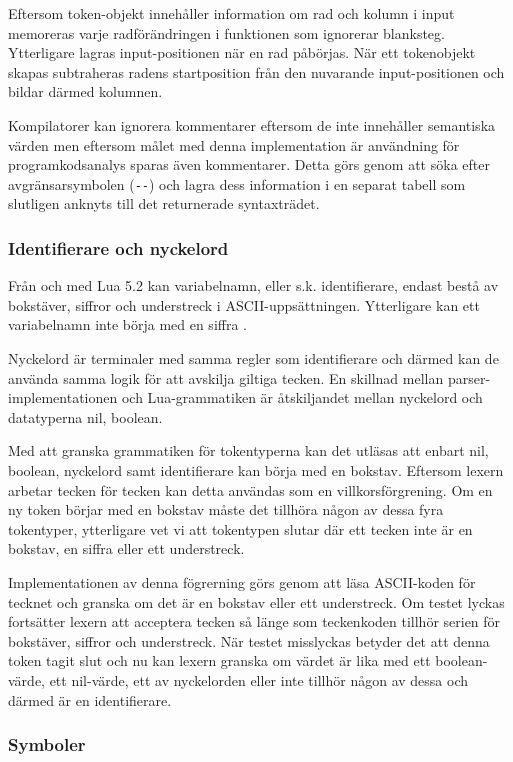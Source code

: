 Eftersom token-objekt innehåller information om rad och kolumn i input
memoreras varje radförändringen i funktionen som ignorerar blanksteg.
Ytterligare lagras input-positionen när en rad påbörjas. När ett tokenobjekt
skapas subtraheras radens startposition från den nuvarande input-positionen
och bildar därmed kolumnen.

Kompilatorer kan ignorera kommentarer eftersom de inte innehåller semantiska
värden men eftersom målet med denna implementation är användning för
programkodsanalys sparas även kommentarer. Detta görs genom att söka efter
avgränsarsymbolen (\verb+--+) och lagra dess information i en separat tabell
som slutligen anknyts till det returnerade syntaxträdet.

\subsubsection{Identifierare och nyckelord}

Från och med Lua 5.2 kan variabelnamn, eller s.k. identifierare, endast bestå av
bokstäver, siffror och understreck i ASCII-uppsättningen. Ytterligare kan ett
variabelnamn inte börja med en siffra \citep{luaref}.

Nyckelord är terminaler med samma regler som identifierare och därmed kan de
använda samma logik för att avskilja giltiga tecken. En skillnad mellan
parser-implementationen och Lua-grammatiken är åtskiljandet mellan nyckelord
och datatyperna nil, boolean.

Med att granska grammatiken för tokentyperna kan det utläsas att enbart nil,
boolean, nyckelord samt identifierare kan börja med en bokstav. Eftersom
lexern arbetar tecken för tecken kan detta användas som en villkorsförgrening.
Om en ny token börjar med en bokstav måste det tillhöra någon av dessa fyra
tokentyper, ytterligare vet vi att tokentypen slutar där ett tecken inte är en
bokstav, en siffra eller ett understreck.

Implementationen av denna fögrerning görs genom att läsa ASCII-koden för
tecknet och granska om det är en bokstav eller ett understreck. Om testet
lyckas fortsätter lexern att acceptera tecken så länge som teckenkoden tillhör
serien för bokstäver, siffror och understreck. När testet misslyckas betyder
det att denna token tagit slut och nu kan lexern granska om värdet är lika med
ett boolean-värde, ett nil-värde, ett av nyckelorden eller inte tillhör någon
av dessa och därmed är en identifierare.

\subsubsection{Symboler}

